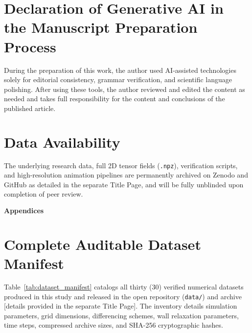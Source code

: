 \documentclass[11pt,a4paper]{article}
\begin{document}
\section*{Declaration of Generative AI in the Manuscript Preparation Process}
During the preparation of this work, the author used AI-assisted technologies solely for editorial consistency, grammar verification, and scientific language polishing. After using these tools, the author reviewed and edited the content as needed and takes full responsibility for the content and conclusions of the published article.

\section*{Data Availability}
The underlying research data, full 2D tensor fields (\texttt{.npz}), verification scripts, and high-resolution animation pipelines are permanently archived on Zenodo and GitHub as detailed in the separate Title Page, and will be fully unblinded upon completion of peer review.




\clearpage
\appendix
\renewcommand{\thetable}{\Alph{section}.\arabic{table}}
\renewcommand{\thefigure}{\Alph{section}.\arabic{figure}}

\begin{center}
    \vspace*{1em}
    {\huge \textbf{Appendices}}
    \vspace*{1em}
\end{center}

\section{Complete Auditable Dataset Manifest}
\label{sec:appendix_manifest}
\setcounter{table}{0}

Table~\ref{tab:dataset_manifest} catalogs all thirty (30) verified numerical datasets produced in this study and released in the open repository (\texttt{data/}) and archive [details provided in the separate Title Page]. The inventory details simulation parameters, grid dimensions, differencing schemes, wall relaxation parameters, time steps, compressed archive sizes, and SHA-256 cryptographic hashes.
\end{document}
